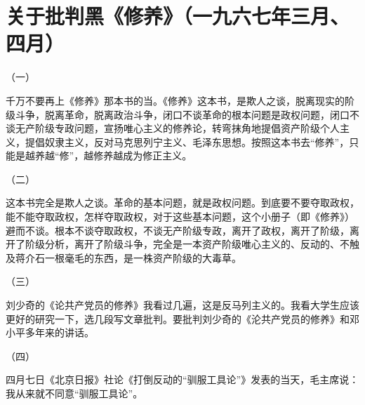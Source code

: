 \section[关于批判黑《修养》（一九六七年三月、四月）]{关于批判黑《修养》（一九六七年三月、四月）}


（一）

千万不要再上《修养》那本书的当。《修养》这本书，是欺人之谈，脱离现实的阶级斗争，脱离革命，脱离政治斗争，闭口不谈革命的根本问题是政权问题，闭口不谈无产阶级专政问题，宣扬唯心主义的修养论，转弯抹角地提倡资产阶级个人主义，提倡奴隶主义，反对马克思列宁主义、毛泽东思想。按照这本书去“修养”，只能是越养越“修”，越修养越成为修正主义。


（二）

这本书完全是欺人之谈。革命的基本问题，就是政权问题。到底要不要夺取政权，能不能夺取政权，怎样夺取政权，对于这些基本问题，这个小册子（即《修养》）避而不谈。根本不谈夺取政权，不谈无产阶级专政，离开了政权，离开了阶级，离开了阶级分析，离开了阶级斗争，完全是一本资产阶级唯心主义的、反动的、不触及蒋介石一根毫毛的东西，是一株资产阶级的大毒草。


（三）

刘少奇的《论共产党员的修养》我看过几遍，这是反马列主义的。我看大学生应该更好的研究一下，选几段写文章批判。要批判刘少奇的《沦共产党员的修养》和邓小平多年来的讲话。

（四）

四月七日《北京日报》社论《打倒反动的“驯服工具论”》发表的当天，毛主席说：我从来就不同意“驯服工具论”。



